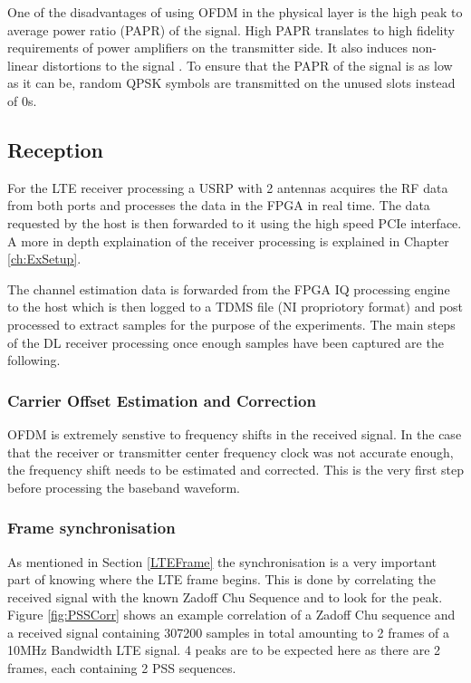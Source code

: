 One of the disadvantages of using OFDM in the physical layer is the high peak to average power ratio (PAPR) of the signal. High PAPR translates to high fidelity requirements of power amplifiers on the transmitter side. It also induces non-linear distortions to the signal \cite{rohling}. To ensure that the PAPR of the signal is as low as it can be, random QPSK symbols are transmitted on the unused slots instead of 0s.

\subsection{Reception}

For the LTE receiver processing a USRP with 2 antennas acquires the RF data from both ports and processes the data in the FPGA in real time. The data requested by the host is then forwarded to it using the high speed PCIe interface. A more in depth explaination of the receiver processing is explained in Chapter \ref{ch:ExSetup}.

The channel estimation data is forwarded from the FPGA IQ processing engine to the host which is then logged to a TDMS file (NI propriotory format) and post processed to extract samples for the purpose of the experiments. The main steps of the DL receiver processing once enough samples have been captured are the following.


\subsubsection{Carrier Offset Estimation and Correction}
OFDM is extremely senstive to frequency shifts in the received signal. In the case that the receiver or transmitter center frequency clock was not accurate enough, the frequency shift needs to be estimated and corrected. This is the very first step before processing the baseband waveform.

\subsubsection{Frame synchronisation}
As mentioned in Section \ref{LTEFrame} the synchronisation is a very important part of knowing where the LTE frame begins. This is done by correlating the received signal with the known Zadoff Chu Sequence and to look for the peak. Figure \ref{fig:PSSCorr} shows an example correlation of a Zadoff Chu sequence and a received signal containing 307200 samples in total amounting to 2 frames of a 10\si{\mega\hertz} Bandwidth LTE signal. 4 peaks are to be expected here as there are 2 frames, each containing 2 PSS sequences.

